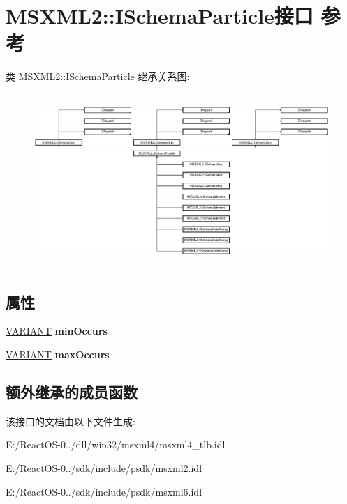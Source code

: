 \hypertarget{interface_m_s_x_m_l2_1_1_i_schema_particle}{}\section{M\+S\+X\+M\+L2\+:\+:I\+Schema\+Particle接口 参考}
\label{interface_m_s_x_m_l2_1_1_i_schema_particle}
类 M\+S\+X\+M\+L2\+:\+:I\+Schema\+Particle 继承关系图\+:\begin{figure}[H]
\begin{center}
\leavevmode
\includegraphics[height=6.632826cm]{interface_m_s_x_m_l2_1_1_i_schema_particle}
\end{center}
\end{figure}
\subsection*{属性}
\begin{DoxyCompactItemize}
\item 
\mbox{\label{interface_m_s_x_m_l2_1_1_i_schema_particle_a5d492c1af321d63bfb1181b2a77ba383}} 
\hyperlink{structtag_v_a_r_i_a_n_t}{V\+A\+R\+I\+A\+NT} {\bfseries min\+Occurs}
\item 
\mbox{\label{interface_m_s_x_m_l2_1_1_i_schema_particle_a6d9a081fdca9a723bf12c2887d51735a}} 
\hyperlink{structtag_v_a_r_i_a_n_t}{V\+A\+R\+I\+A\+NT} {\bfseries max\+Occurs}
\end{DoxyCompactItemize}
\subsection*{额外继承的成员函数}


该接口的文档由以下文件生成\+:\begin{DoxyCompactItemize}
\item 
E\+:/\+React\+O\+S-\/0../dll/win32/msxml4/msxml4\+\_\+tlb.\+idl\item 
E\+:/\+React\+O\+S-\/0../sdk/include/psdk/msxml2.\+idl\item 
E\+:/\+React\+O\+S-\/0../sdk/include/psdk/msxml6.\+idl\end{DoxyCompactItemize}
